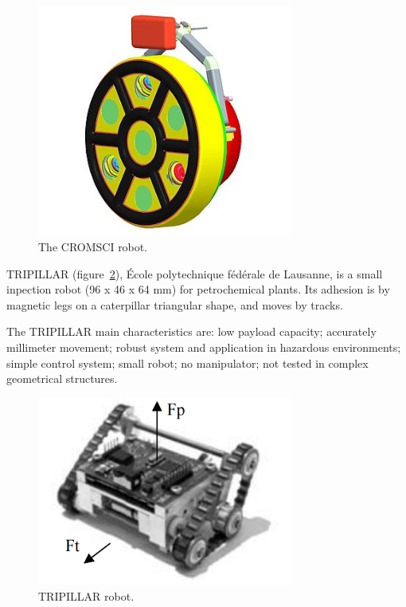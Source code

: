 \begin{figure}[ht]
\centering
\includegraphics[width=8.4cm]{figs/climbers/cromsci.jpg}
\caption{The CROMSCI robot.}
\label{cromsci}
\end{figure}

TRIPILLAR (figure~\ref{tripillar}), École polytechnique fédérale de Lausanne, is
a small inpection robot (96 x 46 x 64 mm) for petrochemical plants. Its
adhesion is by magnetic legs on a caterpillar triangular shape, and moves by
tracks.

The TRIPILLAR main characteristics are: low payload capacity; accurately
millimeter movement; robust system and application in hazardous environments;
simple control system; small robot; no manipulator; not tested in complex
geometrical structures.


\begin{figure}[ht]
\centering
\includegraphics[width=8.4cm]{figs/climbers/tripillar.png}
\caption{TRIPILLAR robot.}
\label{tripillar}
\end{figure}

